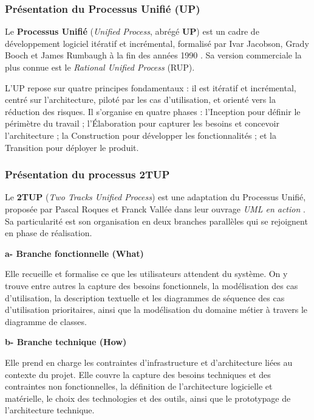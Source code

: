 \subsubsection{Présentation du Processus Unifié (UP)}

Le \textbf{Processus Unifié} (\textit{Unified Process}, abrégé \textbf{UP}) est un cadre de développement logiciel itératif et incrémental, formalisé par Ivar Jacobson, Grady Booch et James Rumbaugh à la fin des années 1990 \cite{jacobson_up}. Sa version commerciale la plus connue est le \textit{Rational Unified Process} (RUP).

L'UP repose sur quatre principes fondamentaux : il est itératif et incrémental, centré sur l'architecture, piloté par les cas d'utilisation, et orienté vers la réduction des risques. Il s'organise en quatre phases : l'Inception pour définir le périmètre du travail ; l'Élaboration pour capturer les besoins et concevoir l'architecture ; la Construction pour développer les fonctionnalités ; et la Transition pour déployer le produit.

\subsubsection{Présentation du processus 2TUP}

Le \textbf{2TUP} (\textit{Two Tracks Unified Process}) est une adaptation du Processus Unifié, proposée par Pascal Roques et Franck Vallée dans leur ouvrage \textit{UML en action} \cite{roques_uml}. Sa particularité est son organisation en deux branches parallèles qui se rejoignent en phase de réalisation.

\vspace{0.4cm}
\noindent\textbf{\textcolor{vertCongo}{a- Branche fonctionnelle (What)}}

\vspace{0.2cm}
Elle recueille et formalise ce que les utilisateurs attendent du système. On y trouve entre autres la capture des besoins fonctionnels, la modélisation des cas d'utilisation, la description textuelle et les diagrammes de séquence des cas d'utilisation prioritaires, ainsi que la modélisation du domaine métier à travers le diagramme de classes.

\vspace{0.4cm}
\noindent\textbf{\textcolor{vertCongo}{b- Branche technique (How)}}

\vspace{0.2cm}
Elle prend en charge les contraintes d'infrastructure et d'architecture liées au contexte du projet. Elle couvre la capture des besoins techniques et des contraintes non fonctionnelles, la définition de l'architecture logicielle et matérielle, le choix des technologies et des outils, ainsi que le prototypage de l'architecture technique.

